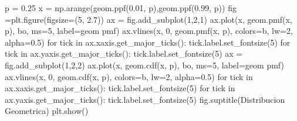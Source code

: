 \documentclass[
  letterpaper,
  DIV=11,
  numbers=noendperiod]{scrreprt}
\newenvironment{Shaded}{\begin{snugshade}}{\end{snugshade}}
\newcommand{\ControlFlowTok}[1]{\textcolor[rgb]{0.00,0.23,0.31}{#1}}
\newcommand{\DecValTok}[1]{\textcolor[rgb]{0.68,0.00,0.00}{#1}}
\newcommand{\FloatTok}[1]{\textcolor[rgb]{0.68,0.00,0.00}{#1}}
\newcommand{\KeywordTok}[1]{\textcolor[rgb]{0.00,0.23,0.31}{#1}}
\newcommand{\NormalTok}[1]{\textcolor[rgb]{0.00,0.23,0.31}{#1}}
\newcommand{\OperatorTok}[1]{\textcolor[rgb]{0.37,0.37,0.37}{#1}}
\newcommand{\StringTok}[1]{\textcolor[rgb]{0.13,0.47,0.30}{#1}}
\begin{document}
\begin{Shaded}
\begin{Highlighting}[]
\NormalTok{p }\OperatorTok{=} \FloatTok{0.25}
\NormalTok{x }\OperatorTok{=}\NormalTok{ np.arange(geom.ppf(}\FloatTok{0.01}\NormalTok{, p),geom.ppf(}\FloatTok{0.99}\NormalTok{, p))}
\NormalTok{fig }\OperatorTok{=}\NormalTok{plt.figure(figsize}\OperatorTok{=}\NormalTok{(}\DecValTok{5}\NormalTok{, }\FloatTok{2.7}\NormalTok{))}
\NormalTok{ax }\OperatorTok{=}\NormalTok{ fig.add\_subplot(}\DecValTok{1}\NormalTok{,}\DecValTok{2}\NormalTok{,}\DecValTok{1}\NormalTok{)}
\NormalTok{ax.plot(x, geom.pmf(x, p), }\StringTok{\textquotesingle{}bo\textquotesingle{}}\NormalTok{, ms}\OperatorTok{=}\DecValTok{5}\NormalTok{, label}\OperatorTok{=}\StringTok{\textquotesingle{}geom pmf\textquotesingle{}}\NormalTok{)}
\NormalTok{ax.vlines(x, }\DecValTok{0}\NormalTok{, geom.pmf(x, p), colors}\OperatorTok{=}\StringTok{\textquotesingle{}b\textquotesingle{}}\NormalTok{, lw}\OperatorTok{=}\DecValTok{2}\NormalTok{, alpha}\OperatorTok{=}\FloatTok{0.5}\NormalTok{)}
\ControlFlowTok{for}\NormalTok{ tick }\KeywordTok{in}\NormalTok{ ax.xaxis.get\_major\_ticks():}
\NormalTok{  tick.label.set\_fontsize(}\DecValTok{5}\NormalTok{)}
\ControlFlowTok{for}\NormalTok{ tick }\KeywordTok{in}\NormalTok{ ax.yaxis.get\_major\_ticks():}
\NormalTok{  tick.label.set\_fontsize(}\DecValTok{5}\NormalTok{) }
\NormalTok{ax }\OperatorTok{=}\NormalTok{ fig.add\_subplot(}\DecValTok{1}\NormalTok{,}\DecValTok{2}\NormalTok{,}\DecValTok{2}\NormalTok{)}
\NormalTok{ax.plot(x, geom.cdf(x, p), }\StringTok{\textquotesingle{}bo\textquotesingle{}}\NormalTok{, ms}\OperatorTok{=}\DecValTok{5}\NormalTok{, label}\OperatorTok{=}\StringTok{\textquotesingle{}geom pmf\textquotesingle{}}\NormalTok{)}
\NormalTok{ax.vlines(x, }\DecValTok{0}\NormalTok{, geom.cdf(x, p), colors}\OperatorTok{=}\StringTok{\textquotesingle{}b\textquotesingle{}}\NormalTok{, lw}\OperatorTok{=}\DecValTok{2}\NormalTok{, alpha}\OperatorTok{=}\FloatTok{0.5}\NormalTok{)}
\ControlFlowTok{for}\NormalTok{ tick }\KeywordTok{in}\NormalTok{ ax.xaxis.get\_major\_ticks():}
\NormalTok{  tick.label.set\_fontsize(}\DecValTok{5}\NormalTok{)}
\ControlFlowTok{for}\NormalTok{ tick }\KeywordTok{in}\NormalTok{ ax.yaxis.get\_major\_ticks():}
\NormalTok{  tick.label.set\_fontsize(}\DecValTok{5}\NormalTok{)}
\NormalTok{fig.suptitle(}\StringTok{\textquotesingle{}Distribucion Geometrica\textquotesingle{}}\NormalTok{)}
\NormalTok{plt.show()}
\end{Highlighting}
\end{Shaded}
\end{document}
